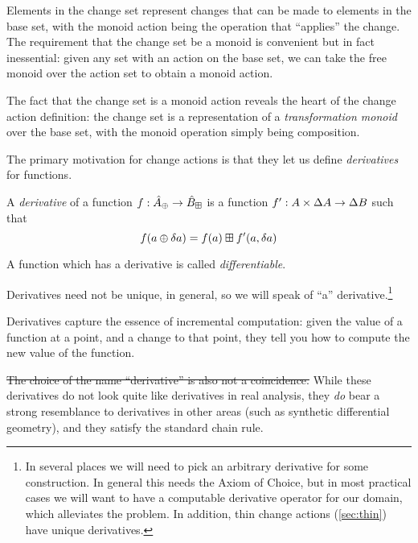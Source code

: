 Elements in the change set represent changes that can be made to elements in the base set, with the
monoid action being the operation that ``applies'' the change.  The requirement that the change set be a monoid is convenient but in fact
inessential: given any set with an action on the base set, we can take the free monoid over the
action set to obtain a monoid action.

The fact that the change set is a monoid action reveals the heart of the
change action definition: the change set is a representation of a
\textit{transformation monoid} over the base set, with the monoid
operation simply being composition.


The primary motivation for change actions is that they let us define
\textit{derivatives} for functions.

\begin{defn}[Derivatives]
  A \textit{derivative} of a function $f: \hat{A}_\oplus \rightarrow \hat{B}_\boxplus$ is a function $f': A \times \Delta A \rightarrow
  \Delta B$ such that
  $$f(a \oplus \delta a) = f(a) \boxplus f'(a, \delta a)$$

  A function which has a derivative is called \textit{differentiable}.
\end{defn}

Derivatives need not be unique, in general, so we will speak of ``a''
derivative.\footnote{In several places we will need to pick an arbitrary
  derivative for some construction. In general this needs the Axiom of Choice,
  but in most practical cases we will want to have a computable derivative
  operator for our domain, which alleviates the problem. In addition, thin
  change actions (\cref{sec:thin}) have unique derivatives.}

Derivatives capture the essence of incremental computation: given the value of a
function at a point, and a change to that point, they tell you how to compute
the new value of the function.

\sout{The choice of the name ``derivative'' is also not a coincidence.} While these
derivatives do not look quite like derivatives in real analysis, they \emph{do}
bear a strong resemblance to derivatives in other areas (such as synthetic differential geometry), and
they satisfy the standard chain rule.

